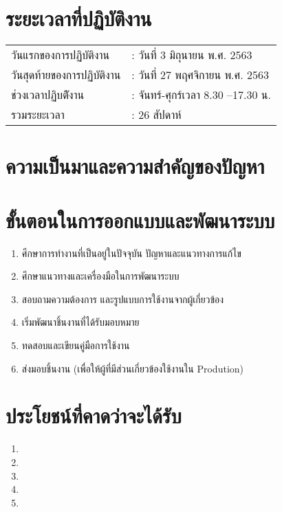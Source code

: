 \section{ระยะเวลาที่ปฏิบัติงาน}
\begin{table}[h]
    \begin{tabular}{ll}
        วันแรกของการปฏิบัติงาน & : วันที่ 3 มิถุนายน พ.ศ. 2563 \\
        วันสุดท้ายของการปฏิบัติงาน & : วันที่ 27 พฤศจิกายน พ.ศ. 2563 \\
        ช่วงเวลาปฏิบตัิงาน & : จันทร์-ศุกร์เวลา 8.30 –17.30 น. \\
        รวมระยะเวลา & : 26 สัปดาห์ \\    
    \end{tabular}
\end{table}

\newline
\section{ความเป็นมาและความสำคัญของปัญหา}

\section{ขั้นตอนในการออกแบบและพัฒนาระบบ}
\begin{enumerate}
    \item ศีกษาการทำงานที่เป็นอยู่ในปัจจุบัน ปัญหาและแนวทางการแก้ไข
    \item ศึกษาแนวทางและเครื่องมือในการพัฒนาระบบ
    \item สอบถามความต้องการ และรูปแบบการใช้งานจากผู้เกี่ยวข้อง
    \item เริ่มพัฒนาชิ้นงานที่ได้รับมอบหมาย
    \item ทดสอบและเขียนคู่มือการใช้งาน
    \item ส่งมอบชิ้นงาน (เพื่อให้ผู้ที่มีส่วนเกี่ยวข้องใช้งานใน Prodution)
\end{enumerate}

\section{ประโยชน์ที่คาดว่าจะได้รับ}
\begin{enumerate}
    \item 
    \item 
    \item 
    \item 
    \item 
\end{enumerate}









